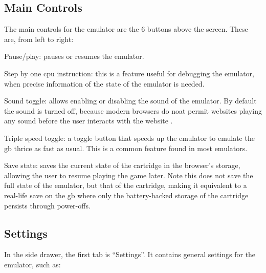 \documentclass[11pt]{informatics-report}
\begin{document}
\subsection{Main Controls}

The main controls for the emulator are the 6 buttons above the screen. These are, from left to right:

\begin{compactitem}
    \item Pause/play: pauses or resumes the emulator.
    \item Step by one \gls{cpu} instruction: this is a feature useful for debugging the emulator, when precise information of the state of the emulator is needed.
    \item Sound toggle: allows enabling or disabling the sound of the emulator. By default the sound is turned off, because modern browsers do noat permit websites playing any sound before the user interacts with the website \cite{browser_autoplay}.
    \item Triple speed toggle: a toggle button that speeds up the emulator to emulate the \gls{gb} thrice as fast as usual. This is a common feature found in most emulators.
    \item Save state: saves the current state of the cartridge in the browser's storage, allowing the user to resume playing the game later. Note this does not save the full state of the emulator, but that of the cartridge, making it equivalent to a real-life save on the \gls{gb} where only the battery-backed storage of the cartridge persists through power-offs.
\end{compactitem}

\subsection{Settings}
\label{sec:settings-ui}

In the side drawer, the first tab is ``Settings''. It contains general settings for the emulator, such as:
\end{document}

